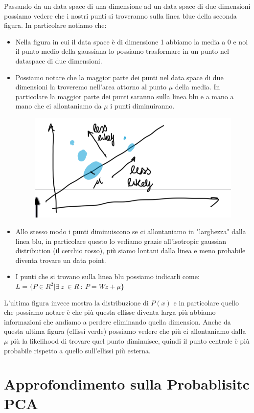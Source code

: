 \documentclass[14pt]{extreport}
\begin{document}
Passando da un data space di una dimensione ad un data space di due dimensioni possiamo vedere che i nostri punti si troveranno sulla linea blue della seconda figura.
In particolare notiamo che:
\begin{itemize}
	\item Nella figura in cui il data space è di dimensione 1 abbiamo la media a 0 e noi il punto medio della gaussiana lo possiamo trasformare in un punto 
	nel dataspace di due dimensioni. 
	\item Possiamo notare che la maggior parte dei punti nel data space di due dimensioni la troveremo nell'area attorno al punto $\mu$ della media.
	In particolare la maggior parte dei punti saranno sulla linea blu e a mano a mano che ci allontaniamo da $\mu$ i punti diminuiranno.
	\begin{figure}[H] 
	\centering
	\includegraphics[width=0.7\linewidth]{484.jpeg}
	\end{figure}
	\item Allo stesso modo i punti diminuiscono se ci allontaniamo in "larghezza" dalla linea blu, in particolare questo lo vediamo grazie all'isotropic gaussian
	distribution (il cerchio rosso), più siamo lontani dalla linea e meno probabile diventa trovare un data point.
	\item I punti che si trovano sulla linea blu possiamo indicarli come:
	$L = \{P \in R^2 | \exists\ z\ \in R \ : \ P=Wz+\mu\}$
\end{itemize}

L'ultima figura invece mostra la distribuzione di $P(x)$ e in particolare quello che possiamo notare è che più questa ellisse diventa larga più abbiamo informazioni 
che andiamo a perdere eliminando quella dimension.
Anche da questa ultima figura (ellissi verde) possiamo vedere che più ci allontaniamo dalla $\mu$ più la likelihood di trovare quel punto diminuisce, quindi il punto
centrale è più probabile rispetto a quello sull'ellissi più esterna.

\section{Approfondimento sulla Probablisitc PCA}
\end{document}
